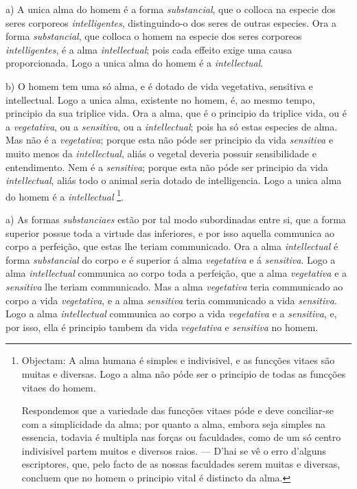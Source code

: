 
  

a) A unica alma do homem é a forma \emph{substancial}, que o colloca na especie dos seres corporeos \emph{intelligentes}, distinguindo-o dos seres de outras especies. Ora a forma \emph{substancial}, que colloca o homem na especie dos seres corporeos \emph{intelligentes}, é a alma \emph{intellectual}; pois cada effeito exige uma causa proporcionada. Logo a unica alma do homem é a \emph{intellectual}.

b) O homem tem uma só alma, e é dotado de vida vegetativa, sensitiva e intellectual. Logo a unica alma, existente no homem, é, ao mesmo tempo, principio da sua triplice vida. Ora a alma, que é o principio da triplice vida, ou é a \emph{vegetativa}, ou a \emph{sensitiva}, ou a \emph{intellectual}; pois ha só estas especies de alma. Mas não é a \emph{vegetativa}; porque esta não póde ser principio da vida \emph{sensitiva} e muito menos da \emph{intellectual}, aliás o vegetal deveria possuir sensibilidade e entendimento. Nem   é a \emph{sensitiva}; porque esta não póde ser principio da vida \emph{intellectual}, aliás todo o animal seria dotado de intelligencia. Logo a unica alma do homem é a \emph{intellectual} \footnote{Objectam: A alma humana é simples e indivisivel, e as funcções vitaes são muitas e diversas. Logo a alma não póde ser o principio de todas as funcções vitaes do homem.\par Respondemos que a variedade das funcções vitaes póde e deve conciliar-se com a simplicidade da alma; por quanto a alma, embora seja simples na essencia, todavia é multipla nas forças ou faculdades, como de um só centro indivisivel partem muitos e diversos raios. --- D'hai se vê o erro d'alguns escriptores, que, pelo facto de as nossas faculdades serem muitas e diversas, concluem que no homem o principio vital é distincto da alma.}.


 

a) As formas \emph{substanciaes} estão por tal modo subordinadas entre si, que a forma superior possue toda a virtude das inferiores, e por isso aquella communica ao corpo a perfeição, que estas lhe teriam communicado. Ora a alma \emph{intellectual} é forma \emph{substancial} do corpo e é superior á alma \emph{vegetativa} e á \emph{sensitiva}. Logo a alma \emph{intellectual} communica ao corpo toda a perfeição, que a alma \emph{vegetativa} e a \emph{sensitiva} lhe teriam communicado. Mas a alma \emph{vegetativa} teria communicado ao corpo a vida \emph{vegetativa}, e a alma \emph{sensitiva} teria communicado a vida \emph{sensitiva}. Logo a alma \emph{intellectual} communica ao corpo a vida \emph{vegetativa} e a \emph{sensitiva}, e, por isso, ella é principio tambem da vida \emph{vegetativa} e \emph{sensitiva} no homem.

